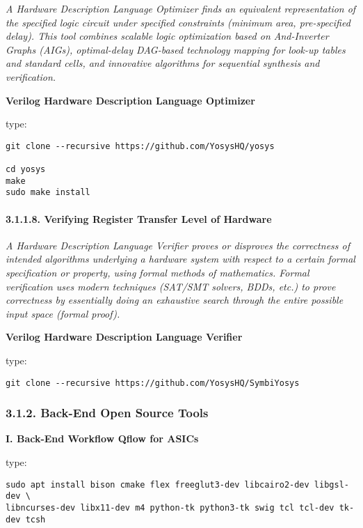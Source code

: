 \documentclass[]{article}
\let\oldparagraph\paragraph
\renewcommand{\paragraph}[1]{\oldparagraph{#1}\mbox{}}
\begin{document}
\emph{A Hardware Description Language Optimizer finds an equivalent
representation of the specified logic circuit under specified
constraints (minimum area, pre-specified delay). This tool combines
scalable logic optimization based on And-Inverter Graphs (AIGs),
optimal-delay DAG-based technology mapping for look-up tables and
standard cells, and innovative algorithms for sequential synthesis and
verification.}

\textbf{Verilog Hardware Description Language Optimizer}

type:

\begin{verbatim}
git clone --recursive https://github.com/YosysHQ/yosys

cd yosys
make
sudo make install
\end{verbatim}

\hypertarget{verifying-register-transfer-level-of-hardware}{%
\paragraph{3.1.1.8. Verifying Register Transfer Level of
Hardware}\label{verifying-register-transfer-level-of-hardware}}

\emph{A Hardware Description Language Verifier proves or disproves the
correctness of intended algorithms underlying a hardware system with
respect to a certain formal specification or property, using formal
methods of mathematics. Formal verification uses modern techniques
(SAT/SMT solvers, BDDs, etc.) to prove correctness by essentially doing
an exhaustive search through the entire possible input space (formal
proof).}

\textbf{Verilog Hardware Description Language Verifier}

type:

\begin{verbatim}
git clone --recursive https://github.com/YosysHQ/SymbiYosys
\end{verbatim}

\hypertarget{back-end-open-source-tools}{%
\subsubsection{3.1.2. Back-End Open Source
Tools}\label{back-end-open-source-tools}}

\textbf{I. Back-End Workflow Qflow for ASICs}

type:

\begin{verbatim}
sudo apt install bison cmake flex freeglut3-dev libcairo2-dev libgsl-dev \
libncurses-dev libx11-dev m4 python-tk python3-tk swig tcl tcl-dev tk-dev tcsh
\end{verbatim}
\end{document}
